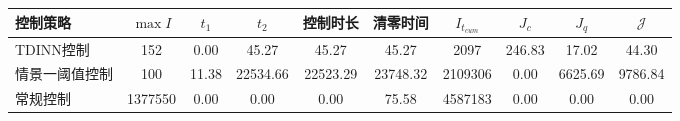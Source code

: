 \begin{tabular}{lccccccccc}
\toprule
控制策略 & $\max I$ & $t_1$ & $t_2$ & 控制时长 & 清零时间 & $I_{t_{cum}}$ & $J_c$ & $J_q$ & $\mathcal J$ \\
\midrule
TDINN控制 & 152 & 0.00 & 45.27 & 45.27 & 45.27 & 2097 & 246.83 & 17.02 & 44.30 \\
情景一阈值控制 & 100 & 11.38 & 22534.66 & 22523.29 & 23748.32 & 2109306 & 0.00 & 6625.69 & 9786.84 \\
常规控制 & 1377550 & 0.00 & 0.00 & 0.00 & 75.58 & 4587183 & 0.00 & 0.00 & 0.00 \\
\bottomrule
\end{tabular}
